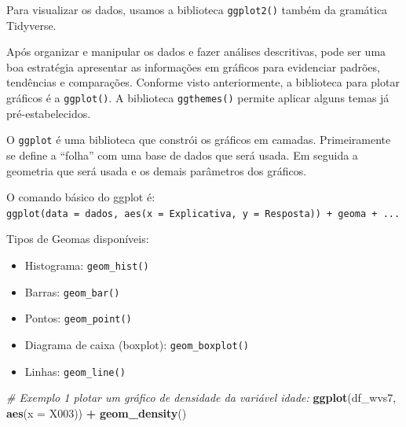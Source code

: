 \documentclass[
  brazil,
]{book}
\newenvironment{Shaded}{\begin{snugshade}}{\end{snugshade}}
\newcommand{\CommentTok}[1]{\textcolor[rgb]{0.56,0.35,0.01}{\textit{#1}}}
\newcommand{\DataTypeTok}[1]{\textcolor[rgb]{0.13,0.29,0.53}{#1}}
\newcommand{\KeywordTok}[1]{\textcolor[rgb]{0.13,0.29,0.53}{\textbf{#1}}}
\newcommand{\NormalTok}[1]{#1}
\newcommand{\OperatorTok}[1]{\textcolor[rgb]{0.81,0.36,0.00}{\textbf{#1}}}
\newcommand{\StringTok}[1]{\textcolor[rgb]{0.31,0.60,0.02}{#1}}
\providecommand{\tightlist}{%
  \setlength{\itemsep}{0pt}\setlength{\parskip}{0pt}}
\begin{document}
Para visualizar os dados, usamos a biblioteca \texttt{ggplot2()} também da gramática Tidyverse.

Após organizar e manipular os dados e fazer análises descritivas, pode ser uma boa estratégia apresentar as informações em gráficos para evidenciar padrões, tendências e comparações. Conforme visto anteriormente, a biblioteca para plotar gráficos é a \texttt{ggplot()}. A biblioteca \texttt{ggthemes()} permite aplicar alguns temas já pré-estabelecidos.

O \texttt{ggplot} é uma biblioteca que constrói os gráficos em camadas. Primeiramente se define a ``folha'' com uma base de dados que será usada. Em seguida a geometria que será usada e os demais parâmetros dos gráficos.

O comando básico do ggplot é: \texttt{ggplot(data\ =\ dados,\ aes(x\ =\ Explicativa,\ y\ =\ Resposta))\ +\ geoma\ +\ ...}

Tipos de Geomas disponíveis:

\begin{itemize}
\tightlist
\item
  Histograma: \texttt{geom\_hist()}
\item
  Barras: \texttt{geom\_bar()}
\item
  Pontos: \texttt{geom\_point()}
\item
  Diagrama de caixa (boxplot): \texttt{geom\_boxplot()}
\item
  Linhas: \texttt{geom\_line()}
\end{itemize}

\begin{Shaded}
\begin{Highlighting}[]
\CommentTok{# Exemplo 1 plotar um gráfico de densidade da variável idade: }
\KeywordTok{ggplot}\NormalTok{(df_wvs7, }\KeywordTok{aes}\NormalTok{(}\DataTypeTok{x =}\NormalTok{ X003)) }\OperatorTok{+}\StringTok{ }\KeywordTok{geom_density}\NormalTok{() }
\end{Highlighting}
\end{Shaded}
\end{document}
